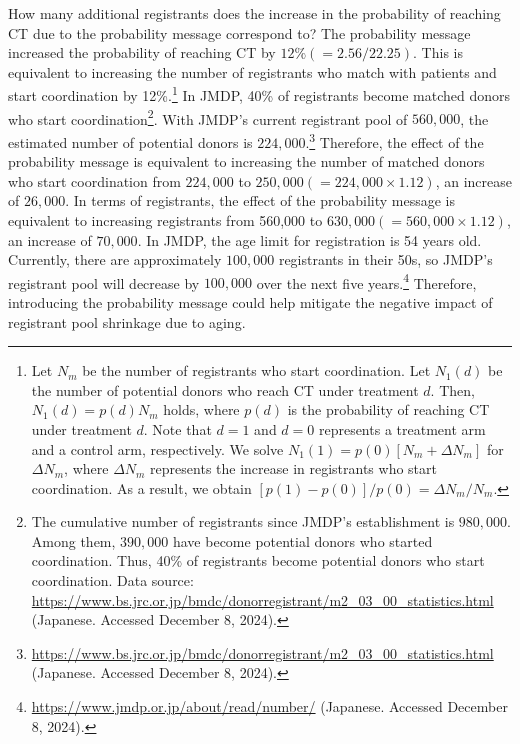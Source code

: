 \documentclass[12pt, a4paper]{article}
\begin{document}
How many additional registrants does the increase in the probability of reaching CT due to the probability message correspond to? The probability message increased the probability of reaching CT by \(12\% (= 2.56/22.25)\). This is equivalent to increasing the number of registrants who match with patients and start coordination by 12\%.\footnote{Let \(N_m\) be the number of registrants who start coordination. Let \(N_1(d)\) be the number of potential donors who reach CT under treatment \(d\). Then, \(N_1(d) = p(d)N_m\) holds, where \(p(d)\) is the probability of reaching CT under treatment \(d\). Note that \(d = 1\) and \(d = 0\) represents a treatment arm and a control arm, respectively. We solve \(N_1(1) = p(0)[N_m + \Delta N_m]\) for \(\Delta N_m\), where \(\Delta N_m\) represents the increase in registrants who start coordination. As a result, we obtain \([p(1) - p(0)]/p(0) = \Delta N_m/N_m\).} In JMDP, 40\% of registrants become matched donors who start coordination\footnote{The cumulative number of registrants since JMDP's establishment is \(980,000\). Among them, \(390,000\) have become potential donors who started coordination. Thus, 40\% of registrants become potential donors who start coordination. Data source: \url{https://www.bs.jrc.or.jp/bmdc/donorregistrant/m2_03_00_statistics.html} (Japanese. Accessed December 8, 2024).}. With JMDP's current registrant pool of \(560,000\), the estimated number of potential donors is \(224,000\).\footnote{\url{https://www.bs.jrc.or.jp/bmdc/donorregistrant/m2_03_00_statistics.html} (Japanese. Accessed December 8, 2024).} Therefore, the effect of the probability message is equivalent to increasing the number of matched donors who start coordination from \(224,000\) to \(250,000 (= 224,000 \times 1.12)\), an increase of \(26,000\). In terms of registrants, the effect of the probability message is equivalent to increasing registrants from 560,000 to \(630,000 (= 560,000 \times 1.12)\), an increase of \(70,000\). In JMDP, the age limit for registration is 54 years old. Currently, there are approximately \(100,000\) registrants in their 50s, so JMDP's registrant pool will decrease by \(100,000\) over the next five years.\footnote{\url{https://www.jmdp.or.jp/about/read/number/} (Japanese. Accessed December 8, 2024).} Therefore, introducing the probability message could help mitigate the negative impact of registrant pool shrinkage due to aging.
\end{document}
